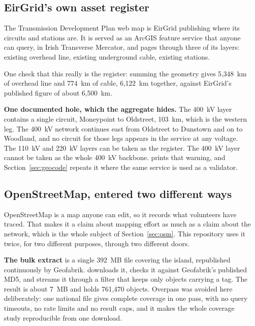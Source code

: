 \documentclass[11pt,a4paper]{article}
\begin{document}
\subsection{EirGrid's own asset register}

The Transmission Development Plan web map is EirGrid publishing where its
circuits and stations are. It is served as an ArcGIS feature service that
anyone can query, in Irish Transverse Mercator, and  pages
through three of its layers: existing overhead line, existing underground
cable, existing stations.

One check that this really is the register: summing the
geometry gives 5{,}348~km of overhead line and 774~km of cable, 6{,}122~km
together, against EirGrid's published figure of about 6{,}500~km.

\textbf{One documented hole, which the aggregate hides.} The 400~kV layer
contains a single circuit, Moneypoint to Oldstreet, 103~km, which is the
western leg. The 400~kV network continues east from Oldstreet to Dunstown and
on to Woodland, and no circuit for those legs appears in the service at any
voltage. The 110~kV and 220~kV layers can be taken as the register. The 400~kV
layer cannot be taken as the whole 400~kV backbone. 
prints that warning, and Section~\ref{sec:geocode} repeats it where the same
service is used as a validator.

\subsection{OpenStreetMap, entered two different ways}

OpenStreetMap is a map anyone can edit, so it records what volunteers have
traced. That makes it a claim about mapping effort as much as a claim about
the network, which is the whole subject of Section~\ref{sec:osm}. This
repository uses it twice, for two different purposes, through two different
doors.

\textbf{The bulk extract} is a single 392~MB file covering the island,
republished continuously by Geofabrik.  downloads it, checks
it against Geofabrik's published MD5, and streams it through a filter that
keeps only objects carrying a  tag. The result is about 7~MB and
holds 761{,}470 objects. Overpass was avoided here deliberately: one national
file gives complete coverage in one pass, with no query timeouts, no rate
limits and no result caps, and it makes the whole coverage study reproducible
from one download.
\end{document}
